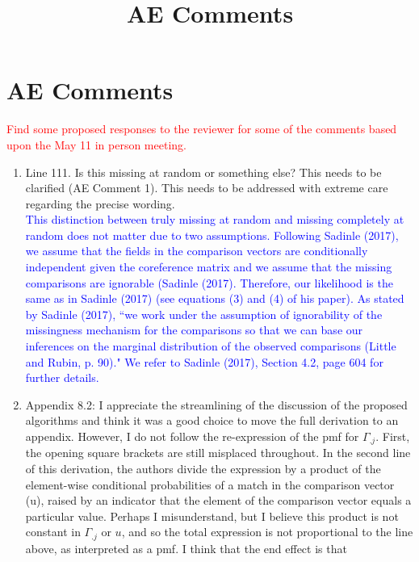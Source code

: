 \documentclass{article}
\begin{document}
\title{AE Comments}
\author{}
\date{}
\maketitle




\section{AE Comments}

\textcolor{red}{Find some proposed responses to the reviewer for some of the comments based upon the May 11 in person meeting.}

\begin{enumerate}
\item Line 111. Is this missing at random or something else? This needs to be clarified (AE Comment 1). This needs to be addressed with extreme care regarding the precise wording. \\
\textcolor{blue}{This distinction between truly missing at random and missing completely at random does not matter due to two assumptions. Following Sadinle (2017), we assume that the fields in the comparison vectors are conditionally independent given the coreference matrix and we assume that the missing comparisons are ignorable (Sadinle (2017). Therefore, our likelihood is the same as in Sadinle (2017) (see equations (3) and (4) of his paper). As stated by Sadinle (2017), ``we work under the assumption of ignorability of the missingness mechanism for the comparisons so that we can base our inferences on the marginal distribution of the observed comparisons (Little and Rubin, p. 90)."  We refer to Sadinle (2017), Section 4.2, page 604 for further details.}
\item Appendix 8.2: I appreciate the streamlining of the discussion of the proposed algorithms and
	think it was a good choice to move the full derivation to an appendix. However, I do not follow
	the re-expression of the pmf for $\Gamma_{.j}$. First, the opening square brackets are still misplaced
	throughout. In the second line of this derivation, the authors divide the expression by a product
	of the element-wise conditional probabilities of a match in the comparison vector (u), raised by
	an indicator that the element of the comparison vector equals a particular value. Perhaps I
	misunderstand, but I believe this product is not constant in $\Gamma_{.j}$ or $u$, and so the total expression
	is not proportional to the line above, as interpreted as a pmf. I think that the end effect is that

\end{enumerate}
\end{document}
